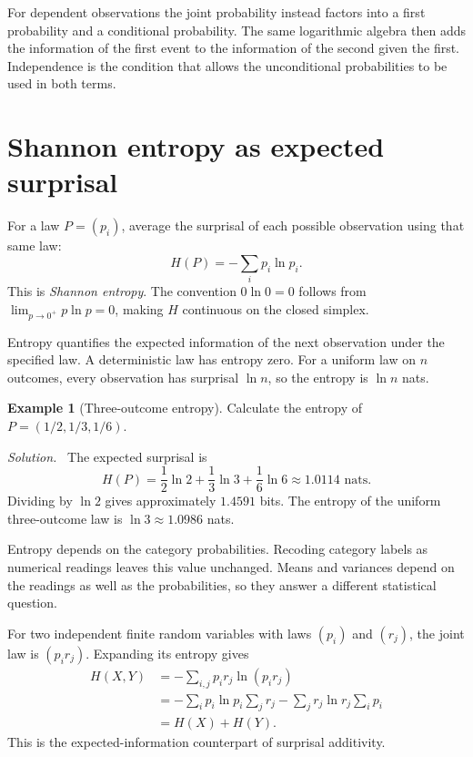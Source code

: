 \documentclass[11pt,oneside,openany]{book}
\theoremstyle{definition}
\newtheorem{example}{Example}[chapter]
\theoremstyle{remark}
\newenvironment{solution}{\par\smallskip\noindent\textit{Solution.}\ }{\par\smallskip}
\numberwithin{equation}{chapter}
\begin{document}
For dependent observations the joint probability instead factors into a first probability and a conditional probability. The same logarithmic algebra then adds the information of the first event to the information of the second given the first. Independence is the condition that allows the unconditional probabilities to be used in both terms.

\section{Shannon entropy as expected surprisal}
For a law $P=(p_i)$, average the surprisal of each possible observation using that same law:
\begin{equation}\label{eq:entropy}
\boxed{H(P)=-\sum_i p_i\ln p_i.}
\end{equation}
This is \emph{Shannon entropy}. The convention $0\ln0=0$ follows from $\lim_{p\to0^+}p\ln p=0$, making $H$ continuous on the closed simplex.

Entropy quantifies the expected information of the next observation under the specified law. A deterministic law has entropy zero. For a uniform law on $n$ outcomes, every observation has surprisal $\ln n$, so the entropy is $\ln n$ nats.

\begin{example}[Three-outcome entropy]
Calculate the entropy of $P=(1/2,1/3,1/6)$.
\begin{solution}
The expected surprisal is
\[
H(P)=\frac12\ln2+\frac13\ln3+\frac16\ln6
\approx1.0114\text{ nats}.
\]
Dividing by $\ln2$ gives approximately $1.4591$ bits. The entropy of the uniform three-outcome law is $\ln3\approx1.0986$ nats.
\end{solution}
\end{example}

Entropy depends on the category probabilities. Recoding category labels as numerical readings leaves this value unchanged. Means and variances depend on the readings as well as the probabilities, so they answer a different statistical question.

For two independent finite random variables with laws $(p_i)$ and $(r_j)$, the joint law is $(p_ir_j)$. Expanding its entropy gives
\begin{align*}
H(X,Y)&=-\sum_{i,j}p_ir_j\ln(p_ir_j)\\
&=-\sum_i p_i\ln p_i\sum_jr_j-\sum_jr_j\ln r_j\sum_ip_i\\
&=H(X)+H(Y).
\end{align*}
This is the expected-information counterpart of surprisal additivity.
\end{document}
